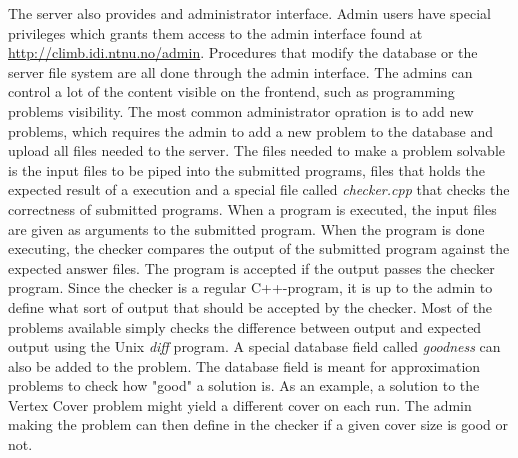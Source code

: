 The server also provides and administrator interface. Admin users have special privileges which grants them access to the admin interface found at \url{http://climb.idi.ntnu.no/admin}. Procedures that modify the database or the server file system are all done through the admin interface. The admins can control a lot of the content visible on the frontend, such as programming problems visibility. The most common administrator opration is to add new problems, which requires the admin to add a new problem to the database and upload all files needed to the server. The files needed to make a problem solvable is the input files to be piped into the submitted programs, files that holds the expected result of a execution and a special file called \textit{checker.cpp} that checks the correctness of submitted programs. When a program is executed, the input files are given as arguments to the submitted program. When the program is done executing, the checker compares the output of the submitted program against the expected answer files. The program is accepted if the output passes the checker program. Since the checker is a regular C++-program, it is up to the admin to define what sort of output that should be accepted by the checker. Most of the problems available simply checks the difference between output and expected output using the Unix \textit{diff} program. A special database field called \textit{goodness} can also be added to the problem. The database field is meant for approximation problems to check how "good" a solution is. As an example, a solution to the Vertex Cover problem might yield a different cover on each run. The admin making the problem can then define in the checker if a given cover size is good or not.


